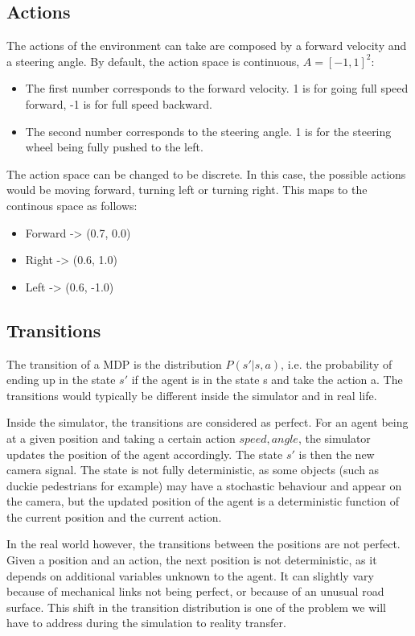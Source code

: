 \documentclass[12pt]{article}
\begin{document}
\subsection{Actions}
The actions of the environment can take are composed by a forward velocity and a steering angle. By default, the action space is continuous, $A = [-1, 1]^2$:
\begin{itemize}
    \item The first number corresponds to the forward velocity. 1 is for going full speed forward, -1 is for full speed backward.
    \item The second number corresponds to the steering angle. 1 is for the steering wheel being fully pushed to the left.
\end{itemize}

The action space can be changed to be discrete. In this case, the possible actions would be moving forward, turning left or turning right. This maps to the continous space as follows:

\begin{itemize}
    \item Forward -> (0.7, 0.0)
    \item Right -> (0.6, 1.0)
    \item Left -> (0.6, -1.0)
\end{itemize}

\subsection{Transitions}
The transition of a MDP is the distribution $P(s'| s, a)$, i.e. the probability of ending up in the state $s'$ if the agent is in the state s and take the action a. The transitions would typically be different inside the simulator and in real life.

Inside the simulator, the transitions are considered as perfect. For an agent being at a given position and taking a certain action  ${speed, angle}$, the simulator updates the position of the agent accordingly. The state $s'$ is then the new camera signal. The state is not fully deterministic, as some objects (such as duckie pedestrians for example) may have a stochastic behaviour and appear on the camera, but the updated position of the agent is a deterministic function of the current
position and the current action.

In the real world however, the transitions between the positions are not perfect. Given a position and an action, the next position is not deterministic, as it depends on additional variables unknown to the agent. It can slightly vary because of mechanical links not being perfect, or because of an unusual road surface. This shift in the transition distribution is one of the problem we will have to address during the simulation to reality transfer.
\end{document}
